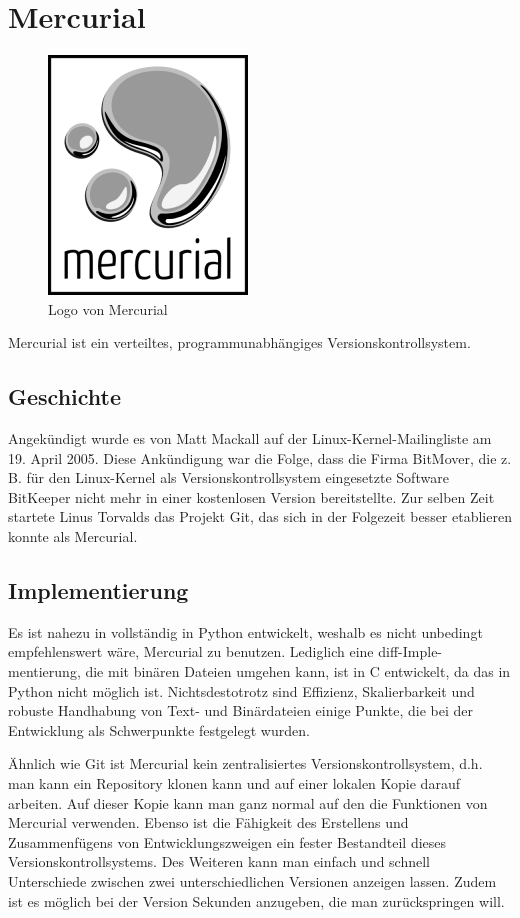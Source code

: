 \section{Mercurial}
\begin{figure}[h]
  \centering
  \includegraphics[scale=0.4]{logo-mercurial.png}
  \caption{Logo von Mercurial}
  \label{fig:mercurial}
\end{figure}
\noindent Mercurial ist ein verteiltes, programmunabhängiges Versionskontrollsystem.
\subsection{Geschichte}
Angekündigt wurde es von Matt Mackall auf der Linux-Kernel-Mailingliste am 19. April 2005. Diese Ankündigung war die Folge, dass die Firma BitMover, die z. B. für den Linux-Kernel als Versionskontrollsystem eingesetzte Software BitKeeper nicht mehr in einer kostenlosen Version bereitstellte. Zur selben Zeit startete Linus Torvalds das Projekt Git, das sich in der Folgezeit besser etablieren konnte als Mercurial.
\subsection{Implementierung}
Es ist nahezu in vollständig in Python entwickelt, weshalb es nicht unbedingt empfehlenswert wäre, Mercurial zu benutzen. Lediglich eine diff-Imple-mentierung, die mit binären Dateien umgehen kann, ist in C entwickelt, da das in Python nicht möglich ist. Nichtsdestotrotz sind Effizienz, Skalierbarkeit und robuste Handhabung von Text- und Binärdateien einige Punkte, die bei der Entwicklung als Schwerpunkte festgelegt wurden.

Ähnlich wie Git ist Mercurial kein zentralisiertes Versionskontrollsystem, d.h. man kann ein Repository klonen kann und auf einer lokalen Kopie darauf arbeiten. Auf dieser Kopie kann man ganz normal auf den die Funktionen von Mercurial verwenden. Ebenso ist die Fähigkeit des Erstellens und Zusammenfügens von Entwicklungszweigen ein fester Bestandteil dieses Versionskontrollsystems. Des Weiteren kann man einfach und schnell Unterschiede zwischen zwei unterschiedlichen Versionen anzeigen lassen. Zudem ist es möglich bei der Version Sekunden anzugeben, die man zurückspringen will.

